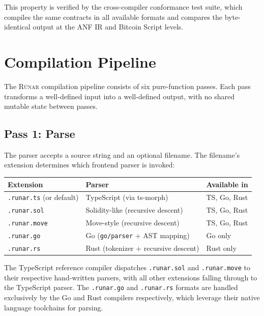 \documentclass[11pt,a4paper]{article}
\newcommand{\runar}{\textsc{Rúnar}}
\begin{document}
This property is verified by the cross-compiler conformance test suite,
which compiles the same contracts in all available formats and compares
the byte-identical output at the ANF IR and Bitcoin Script levels.

\section{Compilation Pipeline}
\label{sec:pipeline}

The \runar{} compilation pipeline consists of six pure-function passes.
Each pass transforms a well-defined input into a well-defined output,
with no shared mutable state between passes.

\subsection{Pass 1: Parse}
\label{sec:pass-parse}

The parser accepts a source string and an optional filename. The filename's
extension determines which frontend parser is invoked:

\begin{center}
\small
\begin{tabular}{@{}lll@{}}
\toprule
\textbf{Extension} & \textbf{Parser} & \textbf{Available in} \\
\midrule
\texttt{.runar.ts} (or default) & TypeScript (via ts-morph) & TS, Go, Rust \\
\texttt{.runar.sol} & Solidity-like (recursive descent) & TS, Go, Rust \\
\texttt{.runar.move} & Move-style (recursive descent) & TS, Go, Rust \\
\texttt{.runar.go} & Go (\texttt{go/parser} + AST mapping) & Go only \\
\texttt{.runar.rs} & Rust (tokenizer + recursive descent) & Rust only \\
\bottomrule
\end{tabular}
\end{center}

The TypeScript reference compiler dispatches \texttt{.runar.sol} and
\texttt{.runar.move} to their respective hand-written parsers, with all
other extensions falling through to the TypeScript parser. The
\texttt{.runar.go} and \texttt{.runar.rs} formats are handled exclusively
by the Go and Rust compilers respectively, which leverage their native
language toolchains for parsing.
\end{document}
